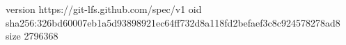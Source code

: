 version https://git-lfs.github.com/spec/v1
oid sha256:326bd60007eb1a5d93898921ec64ff732d8a118fd2befaef3c8c924578278ad8
size 2796368
